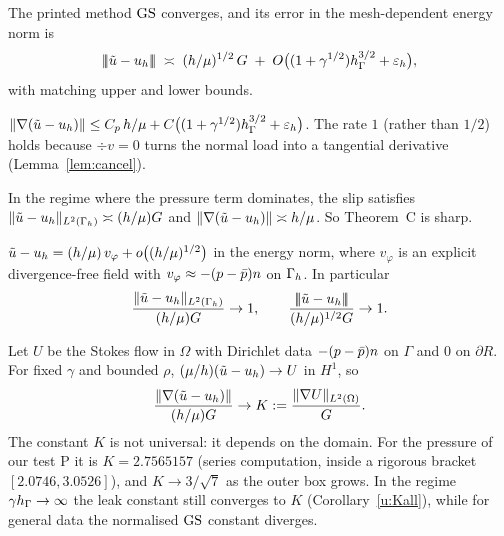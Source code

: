 \begin{theoremA}
The printed method $\mathrm{GS}$ converges, and its error in the mesh-dependent energy norm is
\[
|\!|\!|\tilde u-u_h|\!|\!|\;\asymp\;(h/\mu)^{1/2}\,G\;+\;O\bigl((1+\gamma^{1/2})h_\Gamma^{3/2}+\varepsilon_h\bigr),
\]
with matching upper and lower bounds.
\end{theoremA}

\begin{theoremC}
$\lVert \nabla(\tilde u-u_h)\rVert\le C_p\,h/\mu+C\bigl((1+\gamma^{1/2})h_\Gamma^{3/2}+\varepsilon_h\bigr)$.
The rate $1$ (rather than $1/2$) holds because $\div v=0$ turns the normal load into a tangential derivative (Lemma~\ref{lem:cancel}).
\end{theoremC}

\begin{theoremB}
In the regime where the pressure term dominates, the slip satisfies $\lVert \tilde u-u_h\rVert_{L^2(\Gamma_h)}\asymp (h/\mu)G$ and $\lVert \nabla(\tilde u-u_h)\rVert\asymp h/\mu$. So Theorem~C is sharp.
\end{theoremB}

\begin{corollaryBp}
$\tilde u-u_h=(h/\mu)\,v_\varphi+o\bigl((h/\mu)^{1/2}\bigr)$ in the energy norm, where $v_\varphi$ is an explicit divergence-free field with $v_\varphi\approx-(p-\bar p)n$ on $\Gamma_h$. In particular
\[
\frac{\lVert \tilde u-u_h\rVert_{L^2(\Gamma_h)}}{(h/\mu)G}\to1,
\qquad
\frac{|\!|\!|\tilde u-u_h|\!|\!|}{(h/\mu)^{1/2}G}\to1.
\]
\end{corollaryBp}

\begin{theoremBpp}
Let $U$ be the Stokes flow in $\Omega$ with Dirichlet data $-(p-\bar p)n$ on $\Gamma$ and $0$ on $\partial R$. For fixed $\gamma$ and bounded $\rho$, $(\mu/h)(\tilde u-u_h)\to U$ in $H^1$, so
\[
\frac{\lVert \nabla(\tilde u-u_h)\rVert}{(h/\mu)G}\to K:=\frac{\lVert \nabla U\rVert_{L^2(\Omega)}}{G}.
\]
The constant $K$ is not universal: it depends on the domain. For the pressure of our test P it is $K=2.7565157$ (series computation, inside a rigorous bracket $[2.0746,3.0526]$), and $K\to3/\sqrt7$ as the outer box grows. In the regime $\gamma h_\Gamma\to\infty$ the leak constant still converges to $K$ (Corollary~\ref{u:Kall}), while for general data the normalised $\mathrm{GS}$ constant diverges.
\end{theoremBpp}

